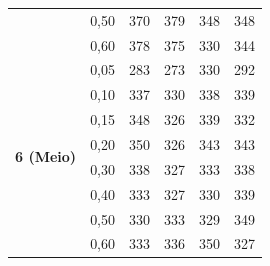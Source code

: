 \begin{table}
\begin{tabular}{clrrrr}
                                                          & 0,50                                                            & 370                        & 379                        & 348                        & 348                         \\
                                                          & 0,60                                                            & 378                        & 375                        & 330                        & 344                         \\ 
    \hline
    \multirow{8}{*}{\textbf{6 (Meio)}}                    & 0,05                                                            & 283                        & 273                        & 330                        & 292                         \\
                                                          & 0,10                                                            & 337                        & 330                        & 338                        & 339                         \\
                                                          & 0,15                                                            & 348                        & 326                        & 339                        & 332                         \\
                                                          & 0,20                                                            & 350                        & 326                        & 343                        & 343                         \\
                                                          & 0,30                                                            & 338                        & 327                        & 333                        & 338                         \\
                                                          & 0,40                                                            & 333                        & 327                        & 330                        & 339                         \\
                                                          & 0,50                                                            & 330                        & 333                        & 329                        & 349                         \\
                                                          & 0,60                                                            & 333                        & 336                        & 350                        & 327                         \\ 

\end{tabular}
\end{table}
